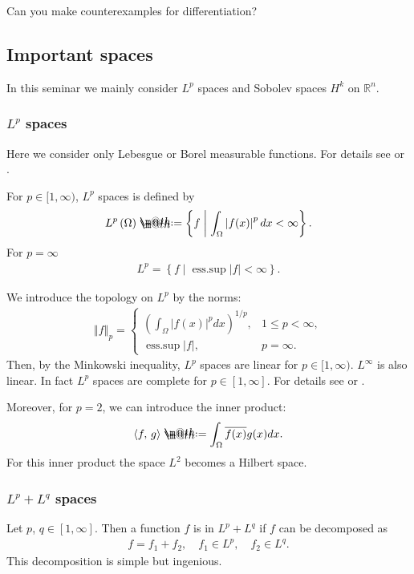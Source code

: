 \documentclass[openany, a4paper, oneside]{jsbook}
\makeatletter
\newcommand*{\defeq}{\mathrel{\rlap{%
\raisebox{0.3ex}{$\m@th\cdot$}}%
\raisebox{-0.3ex}{$\m@th\cdot$}}%
=}
\newcommand{\esssup}{\mathop{\mathrm{ess.sup}}}
\theoremstyle{break}
\theoremstyle{breakdefn}
\newcommand{\abs}[1]{\left|#1\right|}
\newcommand{\norm}[1]{\left\Vert#1\right\Vert}
\newcommand{\rbk}[1]{\left (#1\right)}
\newcommand{\sqbk}[1]{\left[#1\right]}
\newcommand{\bkt}[2]{\left\langle#1,\,#2\right\rangle}
\newcommand{\relmiddle}[1]{\mathrel{}\middle#1\mathrel{}}
\newcommand{\set}[2]{\left\{#1 \relmiddle| #2\right\}}
\newcommand{\bbRn}{\mathbb{R}^n}
\makeatother
\begin{document}
Can you make counterexamples for differentiation?
\subsection{Important spaces}


In this seminar we mainly consider $L^p$ spaces and Sobolev spaces $H^k$ on $\bbRn$.
\subsubsection{$L^p$ spaces}


Here we consider only Lebesgue or Borel measurable functions.
For details see \cite{SeizoIto1} or \cite{LiebLoss1}.

For $p \in [1, \infty)$, $L^p$ spaces is defined by
\begin{align}
 L^p \rbk{\Omega}
 \defeq
 \set{f}{\int_{\Omega} \abs{f (x)}^p dx < \infty}.
\end{align}
For $p = \infty$
\begin{align}
 L^p
 =
 \set{f}{\esssup \abs{f} < \infty}.
\end{align}

We introduce the topology on $L^p$ by the norms:
\begin{align}
 \norm{f}_p
 =
 \begin{cases}
  \rbk{\int_{\Omega} \abs{f (x)}^p dx}^{1/p}, & 1 \leq p < \infty, \\
  \esssup \abs{f}, & p = \infty.
 \end{cases}
\end{align}
Then, by the Minkowski inequality, $L^p$ spaces are linear for $p \in [1, \infty)$.
$L^{\infty}$ is also linear.
In fact $L^p$ spaces are complete for $p \in \sqbk{1, \infty}$.
For details see \cite{SeizoIto1} or \cite{LiebLoss1}.

Moreover, for $p=2$, we can introduce the inner product:
\begin{align}
 \bkt{f}{g}
 \defeq
 \int_{\Omega} \overline{f (x)} g (x) dx.
\end{align}
For this inner product the space $L^2$ becomes a Hilbert space.
\subsubsection{$L^p+L^q$ spaces}


Let $p$, $q \in \sqbk{1, \infty}$.
Then a function $f$ is in $L^p + L^q$ if $f$ can be decomposed as
\begin{align}
 f = f_1 + f_2, \quad
 f_1 \in L^p, \quad f_2 \in L^q.
\end{align}
This decomposition is simple but ingenious.
\end{document}
